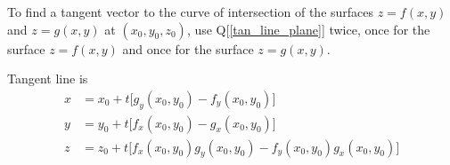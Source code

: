 \begin{hint}
To find a tangent vector to the curve of intersection of the 
surfaces $z=f(x,y)$ and $z=g(x,y)$ at $(x_0,y_0,z_0)$,
use Q[\ref{tan_line_plane}] twice, once for the surface $z=f(x,y)$ and
once for the surface $z=g(x,y)$.
\end{hint}

\begin{answer}
Tangent line is
\begin{align*}
x&=x_0+t\big[g_y(x_0,y_0)-f_y(x_0,y_0)\big] \\
y&=y_0+t\big[f_x(x_0,y_0)-g_x(x_0,y_0)\big] \\
z&=z_0+ t\big[f_x(x_0,y_0)g_y(x_0,y_0)-f_y(x_0,y_0)g_x(x_0,y_0)\big]
\end{align*}
\end{answer}

